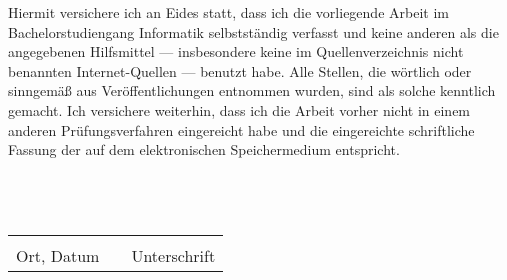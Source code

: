 Hiermit versichere ich an Eides statt, dass ich die vorliegende Arbeit im Bachelorstudiengang Informatik selbstständig verfasst und keine anderen als die angegebenen Hilfsmittel --- insbesondere keine im Quellenverzeichnis nicht benannten Internet-Quellen --- benutzt habe. Alle Stellen, die wörtlich oder sinngemäß aus Veröffentlichungen entnommen wurden, sind als solche kenntlich gemacht. Ich versichere weiterhin, dass ich die Arbeit vorher nicht in einem anderen Prüfungsverfahren eingereicht habe und die eingereichte schriftliche Fassung der auf dem elektronischen Speichermedium entspricht.
\\
\\
\\
\\

\begin{tabular}{lp{2em}l}
 \hspace{5cm}   && \hspace{5cm} \\
 \cline{1-1}\cline{3-3}
 Ort, Datum     && Unterschrift
\end{tabular}